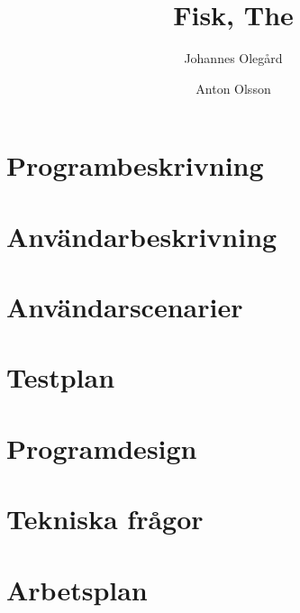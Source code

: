 \documentclass[a4paper, 11pt]{article}
\title{Fisk, The} %
\author{Johannes Olegård \and Anton Olsson}
\begin{document}
\maketitle

\section{Programbeskrivning}


\section{Användarbeskrivning}


\section{Användarscenarier}


\section{Testplan}


\section{Programdesign}


\section{Tekniska frågor}


\section{Arbetsplan}

\end{document}
